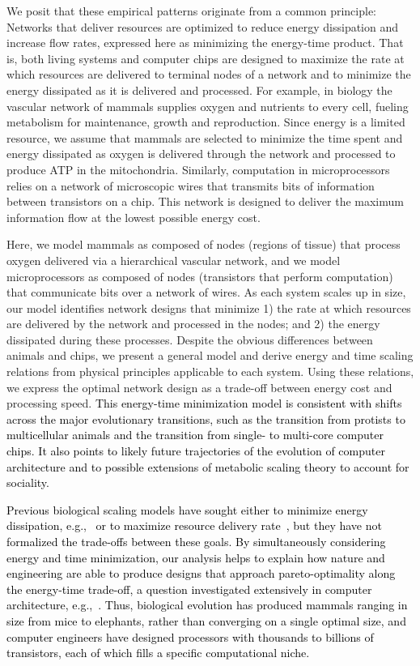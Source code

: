 \documentclass[12pt]{article}
\newcommand{\red}[1]{\textcolor{black}{#1}}
\begin{document}
We posit that these empirical patterns originate from a common principle:
Networks that deliver resources are optimized to reduce energy dissipation and
increase flow rates, expressed here as minimizing the energy-time product. That
is, both living systems and computer chips are designed to maximize the rate at
which resources are delivered to terminal nodes of a network and to minimize
the energy dissipated as it is delivered and processed.  For example, in biology the vascular network of mammals supplies oxygen and nutrients to every cell, fueling metabolism for
maintenance, growth and reproduction.  Since energy is a limited resource, we
assume that mammals are selected to minimize the time spent and energy dissipated as oxygen is delivered through the network \cite{west97} and processed to produce ATP in the mitochondria. Similarly, computation in microprocessors relies on a
network of microscopic wires that transmits bits of information between
transistors on a chip. This network is designed to deliver the maximum information
flow at the lowest possible energy cost.

Here, we model mammals as composed of nodes (regions of tissue) that process oxygen
delivered via a hierarchical vascular network, and we model
microprocessors as composed of nodes (transistors that perform computation) that communicate
bits over a network of wires.  As each system scales up in size,
our model identifies network designs that minimize 1) the rate at which resources are delivered by the network and
processed in the nodes; and 2) the energy dissipated during these processes.
Despite the obvious differences between animals and chips, we present a
general model and derive energy and time scaling relations from physical
principles applicable to each system. Using these relations, we express the
optimal network design as a trade-off between energy cost and processing speed. \red{This energy-time minimization model is consistent with shifts across the major
evolutionary transitions,
such as the transition from protists to
multicellular animals and the transition from single- to multi-core
computer chips.
It also points to likely future trajectories of the evolution of
computer architecture and to possible extensions of metabolic scaling
theory to account for sociality.}


\red{Previous biological scaling models have sought either to minimize energy dissipation, e.g.,~\cite{west97} or to maximize resource delivery rate~\cite{banavar10}, but they have
not formalized the trade-offs between these goals.  By simultaneously considering energy and time minimization, our analysis
helps to explain how nature and engineering are able to produce designs that
approach pareto-optimality along the energy-time trade-off, a question investigated extensively in computer architecture, e.g.,~\cite{horowitz2005scaling, azizi2010energy}. Thus, biological
evolution has produced mammals ranging in size from mice to elephants, rather
than converging on a single optimal size, and computer engineers have designed processors with thousands to
billions of transistors, each of which fills a specific computational niche.}
\end{document}
